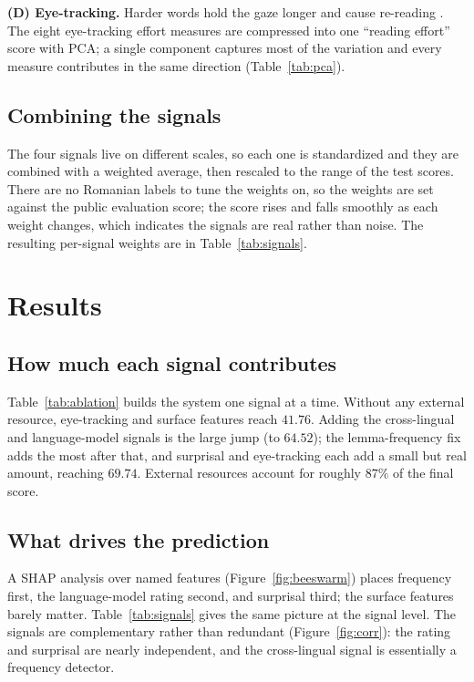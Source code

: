 \documentclass[11pt]{article}
\begin{document}
\textbf{(D) Eye-tracking.} Harder words hold the gaze longer and cause re-reading \citep{rayner1998eye}. The eight
eye-tracking effort measures are compressed into one ``reading effort'' score with PCA; a single component captures
most of the variation and every measure contributes in the same direction (Table~\ref{tab:pca}).

\subsection{Combining the signals}
The four signals live on different scales, so each one is standardized and they are combined with a weighted
average, then rescaled to the range of the test scores. There are no Romanian labels to tune the weights on, so the
weights are set against the public evaluation score; the score rises and falls smoothly as each weight changes,
which indicates the signals are real rather than noise. The resulting per-signal weights are in
Table~\ref{tab:signals}.

\section{Results}
\label{sec:results}

\subsection{How much each signal contributes}
Table~\ref{tab:ablation} builds the system one signal at a time. Without any external resource, eye-tracking and
surface features reach $41.76$. Adding the cross-lingual and language-model signals is the large jump (to $64.52$);
the lemma-frequency fix adds the most after that, and surprisal and eye-tracking each add a small but real amount,
reaching $69.74$. External resources account for roughly $87\%$ of the final score.

\subsection{What drives the prediction}
A SHAP analysis over named features (Figure~\ref{fig:beeswarm}) places frequency first, the language-model rating
second, and surprisal third; the surface features barely matter. Table~\ref{tab:signals} gives the same picture at
the signal level. The signals are complementary rather than redundant (Figure~\ref{fig:corr}): the rating and
surprisal are nearly independent, and the cross-lingual signal is essentially a frequency detector.
\end{document}
